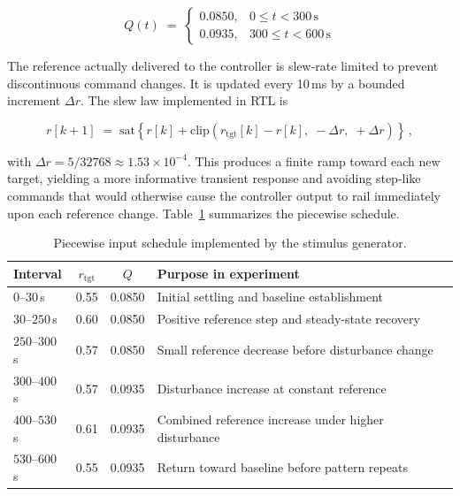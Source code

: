 \begin{equation}
  Q(t) \;=\;
  \begin{cases}
    0.0850, & 0 \le t < 300\,\mathrm{s} \\
    0.0935, & 300 \le t < 600\,\mathrm{s}
  \end{cases}
  \label{eq:Q_disturbance}
\end{equation}

The reference actually delivered to the controller is slew-rate limited
to prevent discontinuous command changes.  It is updated every 10\,ms by
a bounded increment $\Delta r$.  The slew law implemented in RTL is

\begin{equation}
  r[k+1] \;=\; \mathrm{sat}\!\left\{
    r[k] + \mathrm{clip}\left(r_{\mathrm{tgt}}[k] - r[k],\;
    -\Delta r,\; +\Delta r\right)
  \right\} \,,
  \label{eq:slew_law}
\end{equation}

with $\Delta r = 5/32768 \approx 1.53\times10^{-4}$.  This produces a
finite ramp toward each new target, yielding a more informative
transient response and avoiding step-like commands that would otherwise
cause the controller output to rail immediately upon each reference
change.  Table~\ref{tab:bench_stimulus} summarizes the piecewise schedule.

\begin{table}[h!]
  \centering
  \caption{Piecewise input schedule implemented by the stimulus
           generator.}
  \label{tab:bench_stimulus}
  \renewcommand{\arraystretch}{1.25}
  \begin{tabular}{@{} l c c p{5.5cm} @{}}
    \toprule
    \textbf{Interval} & \textbf{$r_{\mathrm{tgt}}$} &
    \textbf{$Q$} & \textbf{Purpose in experiment} \\
    \midrule
    $0$--$30$\,s   & 0.55 & 0.0850 & Initial settling and baseline establishment \\
    $30$--$250$\,s & 0.60 & 0.0850 & Positive reference step and steady-state recovery \\
    $250$--$300$\,s& 0.57 & 0.0850 & Small reference decrease before disturbance change \\
    $300$--$400$\,s& 0.57 & 0.0935 & Disturbance increase at constant reference \\
    $400$--$530$\,s& 0.61 & 0.0935 & Combined reference increase under higher disturbance \\
    $530$--$600$\,s& 0.55 & 0.0935 & Return toward baseline before pattern repeats \\
    \bottomrule
  \end{tabular}
\end{table}

